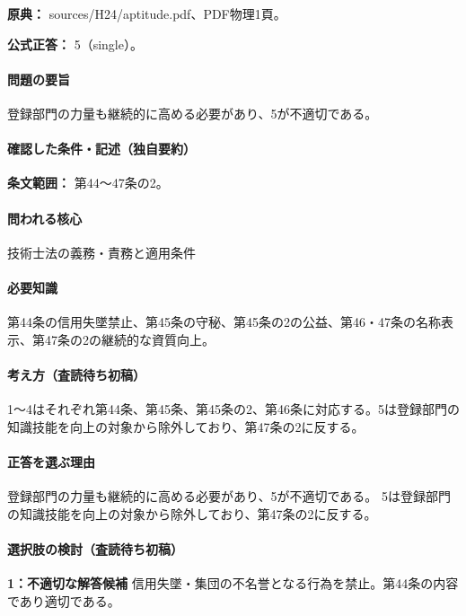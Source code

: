 \noindent\textbf{原典：} sources/H24/aptitude.pdf、PDF物理1頁。

\textbf{公式正答：} 5（single）。

\paragraph{問題の要旨} 登録部門の力量も継続的に高める必要があり、5が不適切である。

\paragraph{確認した条件・記述（独自要約）}\mbox{}\par

\noindent\textbf{条文範囲：} 第44～47条の2。\par

\paragraph{問われる核心} 技術士法の義務・責務と適用条件

\paragraph{必要知識} 第44条の信用失墜禁止、第45条の守秘、第45条の2の公益、第46・47条の名称表示、第47条の2の継続的な資質向上。

\paragraph{考え方（査読待ち初稿）} 1～4はそれぞれ第44条、第45条、第45条の2、第46条に対応する。5は登録部門の知識技能を向上の対象から除外しており、第47条の2に反する。

\paragraph{正答を選ぶ理由} 登録部門の力量も継続的に高める必要があり、5が不適切である。 5は登録部門の知識技能を向上の対象から除外しており、第47条の2に反する。

\paragraph{選択肢の検討（査読待ち初稿）}\mbox{}\par

\noindent\textbf{1：不適切な解答候補} 信用失墜・集団の不名誉となる行為を禁止。第44条の内容であり適切である。\par

